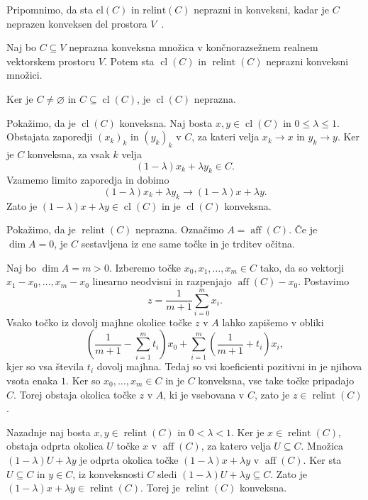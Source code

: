 \documentclass[mat2, tisk]{fmfdelo}
\begin{document}
Pripomnimo, da sta $\mathrm{cl}(C)$ in $\mathrm{relint}(C)$ 
neprazni in konveksni, kadar je $C$ neprazen konveksen del prostora $V$~\cite[izrek 6.2]{rockafellar}.
\begin{trditev}\label{trd:zaprtje_relint}
Naj bo $C\subseteq V$ neprazna konveksna množica v
končnorazsežnem realnem vektorskem prostoru $V$. Potem sta
$\operatorname{cl}(C)$ in $\operatorname{relint}(C)$ neprazni
konveksni množici.
\end{trditev}
\begin{dokaz}
Ker je $C\neq\varnothing$ in
$C\subseteq\operatorname{cl}(C)$, je
$\operatorname{cl}(C)$ neprazna.

Pokažimo, da je $\operatorname{cl}(C)$ konveksna. Naj bosta
$x,y\in\operatorname{cl}(C)$ in $0\leq\lambda\leq1$.
Obstajata zaporedji $(x_k)_k$ in $(y_k)_k$ v $C$, za kateri velja
$x_k\to x$ in $y_k\to y$. Ker je $C$ konveksna, za vsak $k$ velja
\[
(1-\lambda)x_k+\lambda y_k\in C.
\]
Vzamemo limito zaporedja in dobimo
\[
(1-\lambda)x_k+\lambda y_k
\longrightarrow
(1-\lambda)x+\lambda y.
\]
Zato je
$(1-\lambda)x+\lambda y\in\operatorname{cl}(C)$ in je
$\operatorname{cl}(C)$ konveksna.

Pokažimo, da je $\operatorname{relint}(C)$ neprazna. Označimo
$A=\operatorname{aff}(C)$. Če je $\dim A=0$, je $C$ sestavljena iz
ene same točke in je trditev očitna.

Naj bo $\dim A=m>0$. Izberemo točke
$x_0,x_1,\ldots,x_m\in C$ tako, da so vektorji
$x_1-x_0,\ldots,x_m-x_0$ linearno neodvisni in razpenjajo
$\operatorname{aff}(C)-x_0$. Postavimo
\[
z=\frac{1}{m+1}\sum_{i=0}^{m}x_i.
\]
Vsako točko iz dovolj majhne okolice točke $z$ v $A$ lahko zapišemo
v obliki
\[
\left(\frac{1}{m+1}-\sum_{i=1}^{m}t_i\right)x_0
+\sum_{i=1}^{m}\left(\frac{1}{m+1}+t_i\right)x_i,
\]
kjer so vsa števila $t_i$ dovolj majhna. Tedaj so vsi koeficienti
pozitivni in je njihova vsota enaka $1$. Ker so
$x_0,\ldots,x_m\in C$ in je $C$ konveksna, vse take točke pripadajo
$C$. Torej obstaja okolica točke $z$ v $A$, ki je vsebovana v $C$,
zato je $z\in\operatorname{relint}(C)$.

Nazadnje naj bosta $x,y\in\operatorname{relint}(C)$ in
$0<\lambda<1$. Ker je $x\in\operatorname{relint}(C)$, obstaja
odprta okolica $U$ točke $x$ v $\operatorname{aff}(C)$, za katero
velja $U\subseteq C$. Množica
$(1-\lambda)U+\lambda y$
je odprta okolica točke
$(1-\lambda)x+\lambda y$ v $\operatorname{aff}(C)$. Ker sta
$U\subseteq C$ in $y\in C$, iz konveksnosti $C$ sledi
$(1-\lambda)U+\lambda y\subseteq C$.
Zato je
$(1-\lambda)x+\lambda y\in\operatorname{relint}(C)$.
Torej je $\operatorname{relint}(C)$ konveksna.
\end{dokaz}
\end{document}
